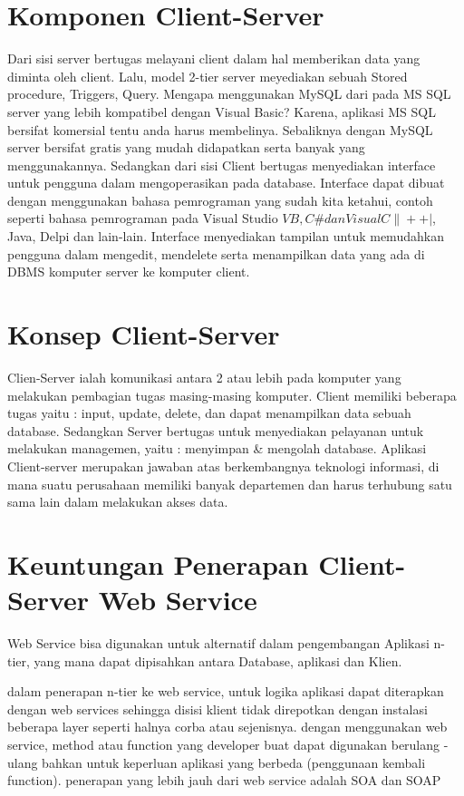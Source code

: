 \section{Komponen Client-Server}
Dari sisi server bertugas melayani client dalam hal memberikan data yang diminta oleh client.
Lalu, model 2-tier server meyediakan sebuah Stored procedure, Triggers, Query. 
Mengapa menggunakan MySQL dari pada MS SQL server yang lebih kompatibel dengan Visual Basic? Karena, aplikasi MS SQL bersifat komersial tentu 
anda harus membelinya. Sebaliknya dengan MySQL server bersifat gratis yang mudah didapatkan serta banyak yang menggunakannya. 
Sedangkan dari sisi Client bertugas menyediakan interface untuk pengguna dalam mengoperasikan pada database. Interface dapat dibuat dengan 
menggunakan bahasa pemrograman yang sudah kita ketahui, contoh seperti bahasa pemrograman pada Visual Studio 
\(VB, C\# dan Visual C\|++|\), Java, Delpi dan lain-lain. 
Interface menyediakan tampilan untuk memudahkan pengguna dalam mengedit, mendelete serta menampilkan data yang ada di DBMS komputer server 
ke komputer client.

\section{Konsep Client-Server}
Clien-Server ialah komunikasi antara 2 atau lebih pada komputer yang melakukan pembagian tugas masing-masing komputer. 
Client memiliki beberapa tugas yaitu : input, update, delete, dan dapat menampilkan data sebuah database. 
Sedangkan Server bertugas untuk menyediakan pelayanan untuk melakukan managemen, yaitu : 
menyimpan \& mengolah database. 
Aplikasi Client-server merupakan jawaban atas berkembangnya teknologi informasi, 
di mana suatu perusahaan memiliki banyak departemen dan harus terhubung satu sama lain dalam melakukan akses data.

\section{Keuntungan Penerapan Client-Server Web Service}
Web Service bisa digunakan untuk alternatif dalam pengembangan Aplikasi n-tier, yang mana dapat dipisahkan
antara Database, aplikasi dan Klien. 

dalam penerapan n-tier ke web service, untuk logika aplikasi dapat diterapkan dengan web services
sehingga disisi klient tidak direpotkan dengan instalasi beberapa layer seperti halnya corba atau sejenisnya.
dengan menggunakan web service, method atau function yang developer buat dapat digunakan berulang - ulang bahkan
untuk keperluan aplikasi yang berbeda (penggunaan kembali function). penerapan yang lebih jauh dari web service adalah SOA dan SOAP

